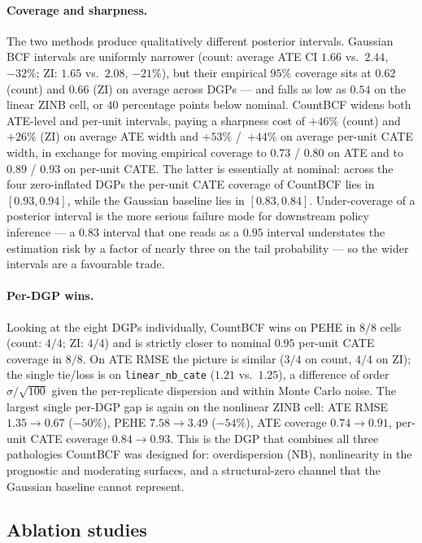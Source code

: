 \documentclass[11pt]{article}
\theoremstyle{plain}
\theoremstyle{definition}
\theoremstyle{remark}
\begin{document}
\paragraph{Coverage and sharpness.} The two methods produce
qualitatively different posterior intervals. Gaussian BCF intervals
are uniformly narrower (count: average ATE CI $1.66$ vs.\ $2.44$,
$-32\%$; ZI: $1.65$ vs.\ $2.08$, $-21\%$), but their empirical
$95\%$ coverage sits at $0.62$ (count) and $0.66$ (ZI) on average
across DGPs --- and falls as low as $0.54$ on the linear ZINB cell,
or $40$ percentage points below nominal. CountBCF widens both
ATE-level and per-unit intervals, paying a sharpness cost of $+46\%$
(count) and $+26\%$ (ZI) on average ATE width and $+53\%$ /\ $+44\%$
on average per-unit CATE width, in exchange for moving empirical
coverage to $0.73$ / $0.80$ on ATE and to $0.89$ / $0.93$ on
per-unit CATE. The latter is essentially at nominal: across the
four zero-inflated DGPs the per-unit CATE coverage of CountBCF lies
in $[0.93, 0.94]$, while the Gaussian baseline lies in
$[0.83, 0.84]$. Under-coverage of a posterior interval is the more
serious failure mode for downstream policy inference --- a $0.83$
interval that one reads as a $0.95$ interval understates the
estimation risk by a factor of nearly three on the tail probability
--- so the wider intervals are a favourable trade.

\paragraph{Per-DGP wins.} Looking at the eight DGPs individually,
CountBCF wins on PEHE in $8/8$ cells (count: $4/4$; ZI: $4/4$) and
is strictly closer to nominal $0.95$ per-unit CATE coverage in
$8/8$. On ATE RMSE the picture is similar ($3/4$ on count, $4/4$ on
ZI); the single tie/loss is on \verb|linear_nb_cate|
($1.21$ vs.\ $1.25$), a difference of order $\widehat\sigma /
\sqrt{100}$ given the per-replicate dispersion and within Monte
Carlo noise. The largest single per-DGP gap is again on the
nonlinear ZINB cell: ATE RMSE $1.35 \to 0.67$ ($-50\%$), PEHE
$7.58 \to 3.49$ ($-54\%$), ATE coverage $0.74 \to 0.91$, per-unit
CATE coverage $0.84 \to 0.93$. This is the DGP that combines all
three pathologies CountBCF was designed for: overdispersion (NB),
nonlinearity in the prognostic and moderating surfaces, and a
structural-zero channel that the Gaussian baseline cannot represent.

\subsection{Ablation studies}\label{sec:emp-abl}
\end{document}
